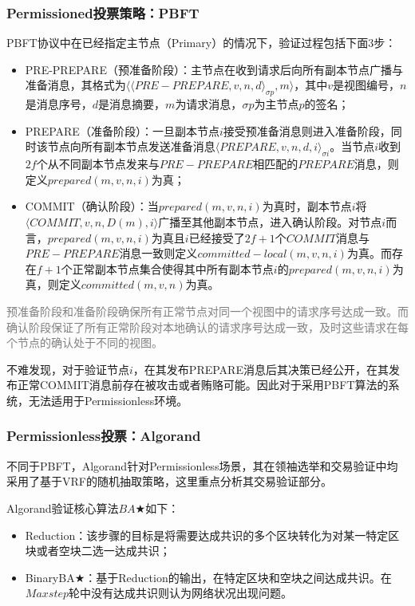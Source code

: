 \subsubsection{Permissioned投票策略：PBFT}
PBFT协议\cite{castro1999practical}中在已经指定主节点（Primary）的情况下，验证过程包括下面3步：
\begin{itemize}
	\item PRE-PREPARE（预准备阶段）：主节点在收到请求后向所有副本节点广播与准备消息，其格式为$\langle \langle PRE-PREPARE,v,n,d \rangle_{\sigma p},m \rangle$，其中$v$是视图编号，$n$是消息序号，$d$是消息摘要，$m$为请求消息，$\sigma p$为主节点$p$的签名；
	\item PREPARE（准备阶段）：一旦副本节点$i$接受预准备消息则进入准备阶段，同时该节点向所有副本节点发送准备消息$\langle PREPARE,v,n,d,i\rangle_{\sigma i}$。当节点$i$收到$2f$个从不同副本节点发来与$PRE-PREPARE$相匹配的$PREPARE$消息，则定义$prepared(m,v,n,i)$为真；
	\item COMMIT（确认阶段）：当$prepared(m,v,n,i)$为真时，副本节点$i$将$\langle COMMIT,v,n,D(m),i\rangle$广播至其他副本节点，进入确认阶段。对节点$i$而言，$prepared(m,v,n,i)$为真且$i$已经接受了$2f+1$个$COMMIT$消息与$PRE-PREPARE$消息一致则定义$committed-local(m,v,n,i)$为真。而存在$f+1$个正常副本节点集合使得其中所有副本节点$i$的$prepared(m,v,n,i)$为真，则定义$committed(m,v,n)$为真。
\end{itemize}

\textcolor{gray}{预准备阶段和准备阶段确保所有正常节点对同一个视图中的请求序号达成一致。而确认阶段保证了所有正常阶段对本地确认的请求序号达成一致，及时这些请求在每个节点的确认处于不同的视图。}

不难发现，对于验证节点$i$，在其发布PREPARE消息后其决策已经公开，在其发布正常COMMIT消息前存在被攻击或者贿赂可能。因此对于采用PBFT算法的系统，无法适用于Permissionless环境。

\subsubsection{Permissionless投票：Algorand}
不同于PBFT，Algorand\cite{gilad2017algorand}针对Permissionless场景，其在领袖选举和交易验证中均采用了基于VRF的随机抽取策略，这里重点分析其交易验证部分。

Algorand验证核心算法$BA\bigstar$如下：
\begin{itemize}
	\item Reduction：该步骤的目标是将需要达成共识的多个区块转化为对某一特定区块或者空块二选一达成共识；
	\item BinaryBA$\bigstar$：基于Reduction的输出，在特定区块和空块之间达成共识。在$Maxstep$轮中没有达成共识则认为网络状况出现问题。
\end{itemize}

